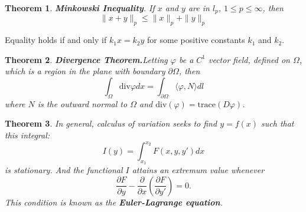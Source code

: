 \documentclass[a4paper]{article}
\theoremstyle{definition}
\theoremstyle{plain}
\newtheorem{theorem}{Theorem}
\begin{document}
\begin{theorem}
\textbf{Minkowski Inequality}. If $x$ and $y$ are in $l_p$, $1\le p\le\infty$, then
\begin{equation*}
    \|x+y\|_p\le\|x\|_p+\|y\|_p
\end{equation*}
\end{theorem}
Equality holds if and only if $k_1x=k_2y$ for some positive constants $k_1$ and $k_2$.

\begin{theorem}
\textbf{Divergence Theorem.}Letting $\varphi$ be a $C^1$ vector field, defined on $\Omega$, which is a region in the plane with boundary $\partial \Omega$, then
\begin{equation*}
    \int_\Omega\mathrm{div}\varphi dx=\int_{\partial\Omega}\langle\varphi,N\rangle dl
\end{equation*}
where $N$ is the outward normal to $\Omega$ and $\mathrm{div}(\varphi)=\mathrm{trace}(D\varphi)$.
\end{theorem}

\begin{theorem}
In general, calculus of variation seeks to find $y=f(x)$ such that this integral:
\begin{equation*}
    I(y)=\int^{x_2}_{x_1}F(x,y,y')dx
\end{equation*}
is stationary. And the functional $ I$ attains an extremum value whenever
\begin{equation*}
    \frac{\partial F}{\partial y}-\frac{\partial}{\partial x}\left(\frac{\partial F}{\partial y'}\right)=0.
\end{equation*}
This condition is known as the \textbf{Euler-Lagrange equation}.
\end{theorem}
\end{document}
